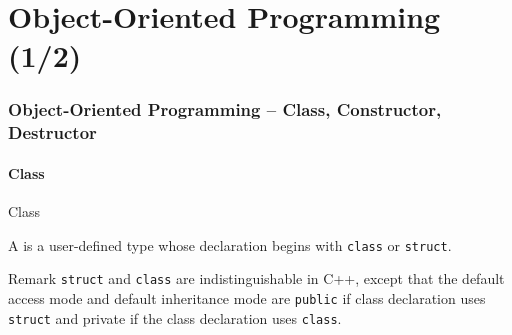 \part{Object-Oriented Programming (1/2)}
\label{part:oop1}

\section{Object-Oriented Programming -- Class, Constructor, Destructor}

\subsection{Class}

\begin{frame}{Class}{}
  \begin{definition}[Class]
    A  is a user-defined type whose declaration begins with \lstinline!class! or \lstinline!struct!.
  \end{definition}

  \begin{block}{Remark}
    \lstinline!struct! and \lstinline!class! are indistinguishable in C++, except that the default access mode and default inheritance mode are \lstinline!public! if class declaration uses \lstinline!struct! and private if the class declaration uses \lstinline!class!.
  \end{block}
\end{frame}


